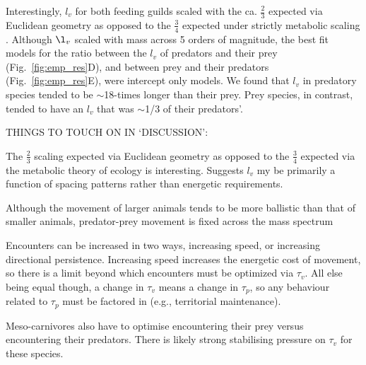 \documentclass[12pt]{article}
\begin{document}
Interestingly, $l_v$ for both feeding guilds scaled with the ca. $\frac{2}{3}$ expected via Euclidean geometry as opposed to the $\frac{3}{4}$ expected under strictly metabolic scaling \cite{Brown:2004}. Although $\l_v$ scaled with mass across 5 orders of magnitude, the best fit models for the ratio between the $l_v$ of predators and their prey (Fig.~\ref{fig:emp_res}D), and between prey and their predators (Fig.~\ref{fig:emp_res}E), were intercept only models. We found that $l_v$ in predatory species tended to be $\sim$18-times longer than their prey. Prey species, in contrast, tended to have an $l_v$ that was $\sim$1/3 of their predators'. 



\noindent THINGS TO TOUCH ON IN `DISCUSSION': 

 The $\frac{2}{3}$ scaling expected via Euclidean geometry as opposed to the $\frac{3}{4}$ expected via the metabolic theory of ecology is interesting. Suggests $l_v$ my be primarily a function of spacing patterns rather than energetic requirements.

Although the movement of larger animals tends to be more ballistic than that of smaller animals, predator-prey movement is fixed across the mass spectrum

Encounters can be increased in two ways, increasing speed, or increasing directional persistence. Increasing speed increases the energetic cost of movement, so there is a limit beyond which encounters must be optimized via $\tau_v$. All else being equal though, a change in $\tau_v$ means a change in $\tau_p$, so any behaviour related to $\tau_p$ must be factored in (e.g., territorial maintenance).

Meso-carnivores also have to optimise encountering their prey versus encountering their predators. There is likely strong stabilising pressure on $\tau_v$ for these species.
\end{document}
